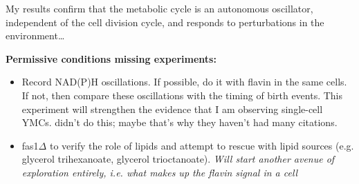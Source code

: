 My results confirm that the metabolic cycle is an autonomous oscillator, independent of the cell division cycle, and responds to perturbations in the environment\ldots{}

\textbf{Permissive conditions missing experiments:}
\begin{itemize}
\item Record NAD(P)H oscillations.  If possible, do it with flavin in the same cells.  If not, then compare these oscillations with the timing of birth events.  This experiment will strengthen the evidence that I am observing single-cell YMCs.  \textcite{baumgartnerFlavinbasedMetabolicCycles2018} didn't do this; maybe that's why they haven't had many citations.
\item fas1$\Delta$ to verify the role of lipids and attempt to rescue with lipid sources (e.g. glycerol trihexanoate, glycerol trioctanoate). \emph{Will start another avenue of exploration entirely, i.e. what makes up the flavin signal in a cell}
\end{itemize}

